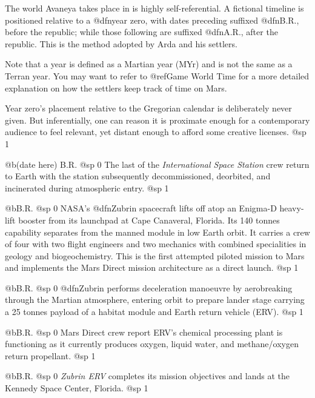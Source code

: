 
The world Avaneya takes place in is highly self-referential. A fictional timeline is positioned relative to a @dfn{year zero}, with dates preceding suffixed @dfn{B.R.}, before the republic; while those following are suffixed @dfn{A.R.}, after the republic. This is the method adopted by Arda and his settlers. 

Note that a year is defined as a Martian year (MYr) and is not the same as a Terran year. You may want to refer to @ref{Game World Time} for a more detailed explanation on how the settlers keep track of time on Mars.

Year zero's placement relative to the Gregorian calendar is deliberately never given. But inferentially, one can reason it is proximate enough for a contemporary audience to feel relevant, yet distant enough to afford some creative licenses.
@sp 1

@b{(date here) B.R.}
@sp 0
The last of the {\it International Space Station} crew return to Earth with the station subsequently decommissioned, deorbited, and incinerated during atmospheric entry.
@sp 1

@b{B.R.}
@sp 0
NASA's @dfn{Zubrin} spacecraft lifts off atop an Enigma-D heavy-lift booster from its launchpad at Cape Canaveral, Florida. Its 140 tonnes capability separates from the manned module in low Earth orbit. It carries a crew of four with two flight engineers and two mechanics with combined specialities in geology and biogeochemistry. This is the first attempted piloted mission to Mars and implements the Mars Direct mission architecture as a direct launch.
@sp 1

@b{B.R.}
@sp 0
@dfn{Zubrin} performs deceleration manoeuvre by aerobreaking through the Martian atmosphere, entering orbit to prepare lander stage carrying a 25 tonnes payload of a habitat module and Earth return vehicle (ERV).
@sp 1

@b{B.R.}
@sp 0
Mars Direct crew report ERV's chemical processing plant is functioning as it currently produces oxygen, liquid water, and methane/oxygen return propellant.
@sp 1

@b{B.R.}
@sp 0
{\it Zubrin ERV} completes its mission objectives and lands at the Kennedy Space Center, Florida.
@sp 1

